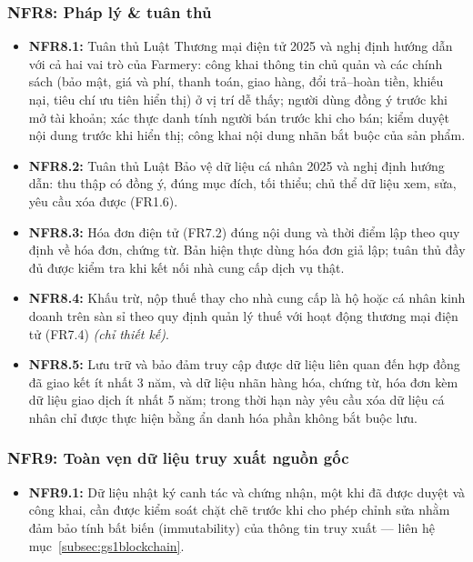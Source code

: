 \subsubsection*{NFR8: Pháp lý \& tuân thủ}
\begin{itemize}
    \item \textbf{NFR8.1:} Tuân thủ Luật Thương mại điện tử 2025 và nghị
    định hướng dẫn với cả hai vai trò của Farmery: công khai thông tin chủ
    quản và các chính sách (bảo mật, giá và phí, thanh toán, giao hàng, đổi
    trả--hoàn tiền, khiếu nại, tiêu chí ưu tiên hiển thị) ở vị trí dễ thấy;
    người dùng đồng ý trước khi mở tài khoản; xác thực danh tính người bán
    trước khi cho bán; kiểm duyệt nội dung trước khi hiển thị; công khai nội
    dung nhãn bắt buộc của sản phẩm.
    \item \textbf{NFR8.2:} Tuân thủ Luật Bảo vệ dữ liệu cá nhân 2025 và
    nghị định hướng dẫn: thu thập có đồng ý, đúng mục đích, tối thiểu; chủ
    thể dữ liệu xem, sửa, yêu cầu xóa được (FR1.6).
    \item \textbf{NFR8.3:} Hóa đơn điện tử (FR7.2) đúng nội dung và thời
    điểm lập theo quy định về hóa đơn, chứng từ. Bản hiện thực dùng hóa đơn
    giả lập; tuân thủ đầy đủ được kiểm tra khi kết nối nhà cung cấp dịch vụ
    thật.
    \item \textbf{NFR8.4:} Khấu trừ, nộp thuế thay cho nhà cung cấp là hộ
    hoặc cá nhân kinh doanh trên sàn sỉ theo quy định quản lý thuế với hoạt
    động thương mại điện tử (FR7.4) \emph{(chỉ thiết kế)}.
    \item \textbf{NFR8.5:} Lưu trữ và bảo đảm truy cập được dữ liệu liên
    quan đến hợp đồng đã giao kết ít nhất 3 năm, và dữ liệu nhãn hàng hóa,
    chứng từ, hóa đơn kèm dữ liệu giao dịch ít nhất 5 năm; trong thời hạn này
    yêu cầu xóa dữ liệu cá nhân chỉ được thực hiện bằng ẩn danh hóa phần không
    bắt buộc lưu.
\end{itemize}

\subsubsection*{NFR9: Toàn vẹn dữ liệu truy xuất nguồn gốc}
\begin{itemize}
    \item \textbf{NFR9.1:} Dữ liệu nhật ký canh tác và chứng nhận, một khi
    đã được duyệt và công khai, cần được kiểm soát chặt chẽ trước khi cho
    phép chỉnh sửa nhằm đảm bảo tính bất biến (immutability) của thông tin
    truy xuất --- liên hệ mục~\ref{subsec:gs1blockchain}.
\end{itemize}

